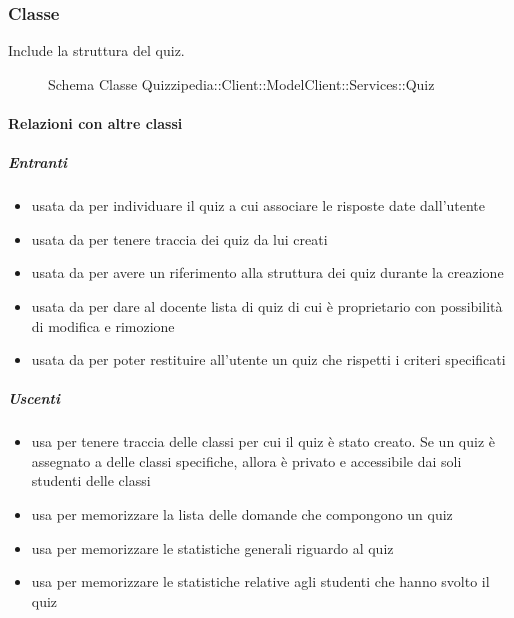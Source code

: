 \subsubsection{Classe }
Include la struttura del quiz.
\begin{figure}[H]
\centering
\noindent{}
\caption[Schema Classe Quiz]{Schema Classe Quizzipedia::Client::ModelClient::Services::Quiz}
\end{figure}
\paragraph{Relazioni con altre classi}
\subparagraph{Entranti}
\begin{itemize}
\item usata da  per individuare il quiz a cui associare le risposte date dall'utente
\item usata da  per tenere traccia dei quiz da lui creati
\item usata da  per avere un riferimento alla struttura dei quiz durante la creazione
\item usata da  per dare al docente lista di quiz di cui è proprietario con possibilità di modifica e rimozione
\item usata da  per poter restituire all'utente un quiz che rispetti i criteri specificati
\end{itemize}
\subparagraph{Uscenti}
\begin{itemize}
\item usa  per tenere traccia delle classi per
cui il quiz è stato creato. Se un quiz è assegnato a delle classi specifiche, allora è privato e
accessibile dai soli studenti delle classi
\item usa  per memorizzare la lista delle domande che compongono un quiz
\item usa  per memorizzare le statistiche generali riguardo al quiz
\item usa  per memorizzare le statistiche relative agli studenti che hanno svolto il quiz
\end{itemize}
